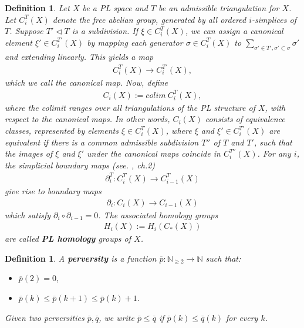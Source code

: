 \documentclass{scrreprt}
\newtheorem{definition}[prop]{Definition}
\begin{document}
\begin{definition}
Let $X$ be a PL space and $T$ be an admissible triangulation for $X$. Let $C_i^{T}(X)$ denote the free abelian group, generated by all ordered $i$-simplices of $T$. Suppose $T' \lhd T$ is a subdivision. If $\xi \in C_i^T(X)$, we can assign a canonical element $\xi' \in C_i^{T'}(X)$ by mapping each generator $\sigma \in C_i^T(X)$ to $\sum_{\sigma' \in T' , \sigma' \subset \sigma} \sigma' $ and extending linearly.
This yields a map
\begin{align*}
C_i^T(X) \to C_i^{T'}(X),
\end{align*}
which we call the canonical map. Now, define
\begin{align*}
C_i(X) := colim \ C_i^T(X),
\end{align*}
where the colimit ranges over all triangulations of the PL structure of $X$, with respect to the canonical maps. In other words, $C_i(X)$ consists of equivalence classes, represented by elements $\xi \in C_i^T(X)$, where $\xi$ and $\xi' \in C_i^{T'}(X)$ are equivalent if there is a common admissible subdivision $T''$ of $T$ and $T'$, such that the images of $\xi$ and $\xi'$ under the canonical maps coincide in $C_i^{T''}(X)$. For any $i$, the simplicial boundary maps (see. \cite{hatcher}, ch.2)
\begin{align*}
\partial_i^T: C_i^T(X) \to C_{i-1}^T(X)
\end{align*}
give rise to boundary maps 
\begin{align*}
\partial_i : C_i(X) \to C_{i-1}(X)
\end{align*}
which satisfy $\partial_i \circ \partial_{i-1}=0$. The associated homology groups
\begin{align*}
H_i(X):= H_i(C_*(X))
\end{align*}
are called \textbf{PL homology} groups of $X$.
\end{definition}

\begin{definition}
A \textbf{perversity} is a function $\overline{p}: \mathbb{N}_{\geq 2} \to \mathbb{N}$ such that:
\begin{itemize}
\item $\overline{p}(2)=0$,
\item $\overline{p}(k) \leq \overline{p}(k+1) \leq \overline{p}(k)+1$.
\end{itemize}
Given two perversities $\overline{p}, \overline{q}$, we write $\overline{p} \leq \overline{q}$ if $\overline{p}(k) \leq \overline{q}(k)$ for every $k$.
\end{definition}
\end{document}
